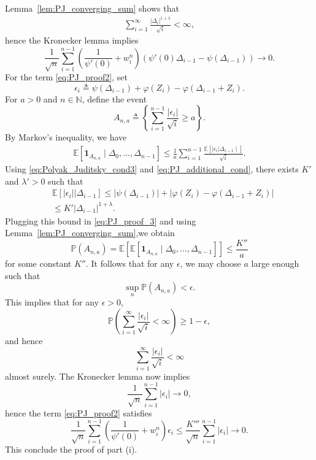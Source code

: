 \documentclass[letterpaper, 11pt]{IEEEtran}      %
\newcommand{\ex}[1]{\ensuremath{\mathbb{E}\left[ #1\right]}}
\newcommand{\Prob}{\mathbb{P} }
\begin{document}
{Lemma~\ref{lem:PJ_converging_sum} shows that 
\begin{align}
\sum_{i=1}^\infty \frac{|\Delta_i|^{1+\lambda}}{\sqrt{i}}  < \infty \label{eq:PJ_converging_sum},
\end{align}
hence the Kronecker lemma implies
\[
\frac{1}{\sqrt{n}} \sum_{i=1}^{n-1} \left( \frac{1}{\psi'(0)}  + w_i^n \right)  \left( \psi'(0) \Delta_{i-1}  - \psi(\Delta_{i-1}) \right) \to 0.
\]
For the term \eqref{eq:PJ_proof2}, set 
\[
\epsilon_i \triangleq \psi(\Delta_{i-1}) + \varphi(Z_i) - \varphi(\Delta_{i-1}+Z_i).
\]
For $a>0$ and $n \in \mathbb N$, define the event
\[
A_{n,a} \triangleq \left\{ \sum_{i=1}^{n-1} \frac{|\epsilon_i|}{\sqrt{i}}  \geq a  \right\}. 
\]
By Markov's inequality, we have
\begin{align}
\ex{\mathbf 1_{A_{n,a}}   \mid \Delta_0,\ldots,\Delta_{n-1} } \leq \frac{1}{a} \sum_{i=1}^{n-1} \frac{ \ex{|\epsilon_i| \Delta_{i-1} \mid }}{\sqrt{i}}. \label{eq:PJ_proof_3}
\end{align}
Using \eqref{eq:Polyak_Juditsky_cond3} and \eqref{eq:PJ_additional_cond}, there exists $K'$ and $\lambda'>0$ such that
\begin{align*}
& \ex{ |\epsilon_i| | \Delta_{i-1}}  \leq |\psi(\Delta_{i-1})| + \left| \varphi(Z_i) - \varphi(\Delta_{i-1}+Z_i) \right|  \\
& \leq K' |\Delta_{i-1}|^{1+\lambda}. 
\end{align*}
Plugging this bound in \eqref{eq:PJ_proof_3} and using Lemma~\ref{lem:PJ_converging_sum},we obtain 
\[
\Prob(A_{n,a}) = \ex{ \ex{\mathbf 1_{A_{n,a}}   \mid \Delta_0,\ldots,\Delta_{n-1} } } \leq  \frac{K''}{a}
\]
for some constant $K''$. It follows that for any $\epsilon$, we may choose $a$ large enough such that 
\[
\sup_{n} \Prob(A_{n,a}) < \epsilon.
\]
This implies that for any $\epsilon>0$,
\[
\Prob \left( \sum_{i=1}^\infty \frac{|\epsilon_i|}{\sqrt{i}} < \infty \right) \geq 1-\epsilon,
\]
and hence 
\[
\sum_{i=1}^\infty \frac{|\epsilon_i|}{\sqrt{i}} < \infty
\]
almost surely. The Kronecker lemma now implies 
\[
\frac{1}{\sqrt{n}} \sum_{i=1}^{n-1} \left|\epsilon_i\right| \to 0,
\]
hence the term \eqref{eq:PJ_proof2} satisfies
\[
\frac{1}{\sqrt{n}} \sum_{i=1}^{n-1} \left( \frac{1}{\psi'(0)}  + w_i^n \right) \epsilon_i \leq \frac{K'''}{\sqrt{n}} \sum_{i=1}^{n-1} |\epsilon_i| \to 0. 
\]
This conclude the proof of part (i).

}
\end{document}
